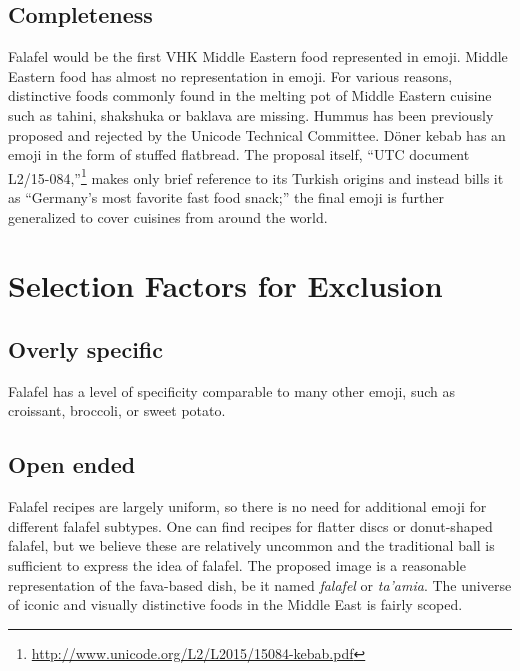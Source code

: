 \documentclass[a4paper,10pt]{article}
\begin{document}
\subsection{Completeness}
Falafel would be the first VHK Middle Eastern food represented in emoji.
Middle Eastern food has almost no representation in emoji. For various reasons, distinctive foods
commonly found in the melting pot of Middle Eastern cuisine such as tahini, shakshuka or
baklava are missing. 
{\sc Hummus} has been previously proposed and rejected by the Unicode Technical Committee. 
 D\"oner kebab has an emoji in the form
of {\sc stuffed flatbread}. The proposal itself, ``UTC document
L2/15-084,''\footnote{\url{http://www.unicode.org/L2/L2015/15084-kebab.pdf}} makes
only brief reference to its Turkish origins and instead bills it as ``Germany's most
favorite fast food snack;'' the final emoji is further generalized to cover cuisines from around the world.
\enlargethispage{\baselineskip}

\section{Selection Factors for Exclusion}

\subsection{Overly specific}

{\sc Falafel} has a level of specificity comparable to many other emoji, such as
{\sc croissant}, {\sc broccoli}, or {\sc sweet potato}.

\subsection{Open ended}

Falafel recipes are largely uniform, so there is no need for additional emoji for
different falafel subtypes. One can find recipes for flatter discs or donut-shaped
falafel, but we believe these are relatively uncommon and the traditional ball is
sufficient to express the idea of falafel. The proposed image is a reasonable
representation of the fava-based dish, be it named {\em falafel} or {\em ta'amia}.
The universe of iconic and visually distinctive foods in the Middle East is fairly scoped.
\end{document}
